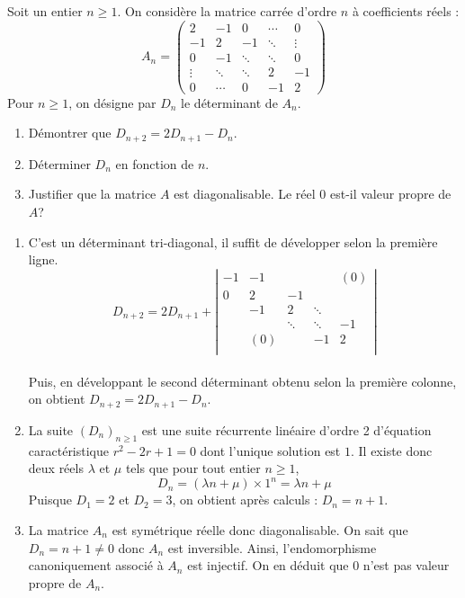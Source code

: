 \documentclass[a4paper,10pt]{report}
\begin{document}
\begin{Exa} Soit un entier $n\geq 1.$ On consid\`{e}re la matrice carr\'{e}e d'ordre $n$ \`{a} coefficients r\'{e}els :
\begin{equation*}
A_n=\begin{pmatrix}
2 & -1 & 0 & \cdots & 0 \\ 
-1 & 2 & -1 & \ddots & \vdots \\ 
0 & -1 & \ddots & \ddots & 0 \\ 
\vdots & \ddots & \ddots & 2 & -1 \\ 
0 & \cdots & 0 & -1 & 2
\end{pmatrix}
\end{equation*}
Pour $n\geq 1$, on d\'{e}signe par $D_{n}$ le d\'{e}terminant de $A_n$.
\begin{enumerate}
\item Démontrer que $D_{n+2}=2D_{n+1}-D_{n}$.
\item D\'{e}terminer $D_{n}$ en fonction de $n$.
\item Justifier que la matrice $A$ est diagonalisable. Le r\'{e}el $0$ est-il valeur propre de $A$?
\end{enumerate}
\end{Exa}

\newpage

\corr \begin{enumerate}
\item
 C'est un déterminant tri-diagonal, il suffit de développer selon la première ligne.
$$D_{n+2}  = 2D_{n +1}  + \left| {
\begin{array}{lllll}
 { - 1} & { - 1} & {} & {} & {(0)}  \\
 0 & 2 & { - 1} & {} & {}  \\
 {} & { - 1} & 2 &  \ddots  & {}  \\
 {} & {} &  \ddots  &  \ddots  & { - 1}  \\
 {} & {(0)} & {} & { - 1} & 2  \\
\end{array}
} \right|$$\\
Puis, en développant le second déterminant obtenu selon la première colonne, on obtient $D_{n+2}=2D_{n+1}-D_n$.
\item
La suite $(D_n)_{n \geq 1}$ est une suite récurrente linéaire d'ordre 2 d'équation caractéristique $r^2  - 2r + 1 = 0$ dont l'unique solution est $1$. Il existe donc deux réels $\lambda$ et $\mu$ tels que pour tout entier $n \geq 1$,
$$D_n  = (\lambda n + \mu ) \times 1^n= \lambda n + \mu$$
Puisque $D_1  = 2$ et $D_2  = 3$, on obtient après calculs :
$D_n  = n + 1$.
\item La matrice $A_n$ est symétrique réelle donc diagonalisable. 
On sait que $D_n=n+1\neq 0$ donc $A_n$ est inversible. Ainsi, l'endomorphisme canoniquement associé à $A_n$ est injectif.
On en déduit que $0$ n'est pas valeur propre de $A_n$.
\end{enumerate}
\end{document}
